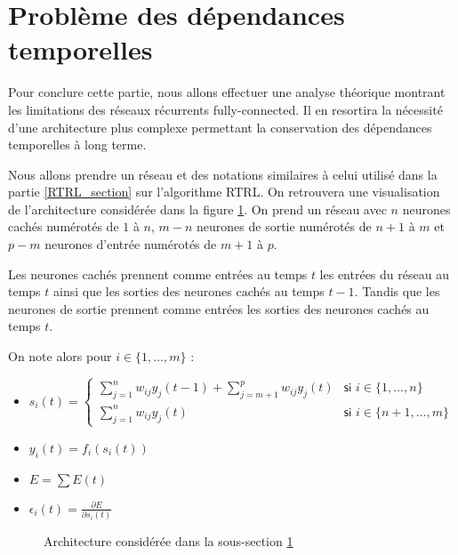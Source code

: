 \section{Problème des dépendances temporelles}

\label{dependances_temporelles}

Pour conclure cette partie, nous allons effectuer une analyse théorique montrant les limitations des réseaux récurrents fully-connected. Il en resortira la nécessité d'une architecture plus complexe permettant la conservation des dépendances temporelles à long terme.

Nous allons prendre un réseau et des notations similaires à celui utilisé dans la partie \ref{RTRL_section} sur l'algorithme RTRL. On retrouvera une visualisation de l'architecture considérée dans la figure \ref{archi_dep_tempo}. On prend un réseau avec $n$ neurones cachés numérotés de $1$ à $n$, $m - n$ neurones de sortie numérotés de $n+1$ à $m$ et $p - m$ neurones d'entrée numérotés de $m+1$ à $p$.

Les neurones cachés prennent comme entrées au temps $t$ les entrées du réseau au temps $t$ ainsi que les sorties des neurones cachés au temps $t-1$. Tandis que les neurones de sortie prennent comme entrées les sorties des neurones cachés au temps $t$.

On note alors pour $i \in \{1, ..., m\}$ :
\begin{itemize}
	\item $s_i(t) = \left\{
    \begin{array}{ll}
        \sum_{j = 1}^{n}{w_{ij}y_j(t-1)} + \sum_{j = m+1}^{p}{w_{ij}y_j(t)} & \textsf{si } i \in \{1, ..., n\} \\
        \sum_{j = 1}^{n}{w_{ij}y_j(t)} & \textsf{si } i \in \{n+1, ..., m\}
    \end{array}
\right.$
	\item $y_i(t) = f_i(s_i(t))$
	\item $E = \sum{E(t)}$
	\item $\epsilon_i(t) = \frac{\partial E}{\partial s_i(t)}$
\end{itemize}

\begin{figure}
\begin{center}

\caption{Architecture considérée dans la sous-section \ref{dependances_temporelles}}
\label{archi_dep_tempo}
\end{center}
\end{figure}

